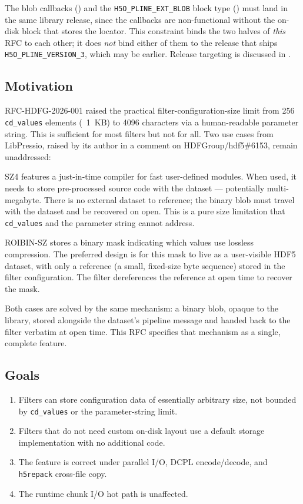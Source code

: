 \documentclass[../RFC-HDFG-2026-003.tex]{subfiles}
\begin{document}
The blob callbacks () and the
\texttt{H5O\_PLINE\_EXT\_BLOB} block type ()
must land in the same library release, since the callbacks are
non-functional without the on-disk block that stores the locator.  This
constraint binds the two halves of \emph{this} RFC to each other; it does
\emph{not} bind either of them to the release that ships
\texttt{H5O\_PLINE\_VERSION\_3}, which may be earlier.  Release targeting
is discussed in .

\subsection{Motivation}
\label{sec:motivation}

RFC-HDFG-2026-001 raised the practical filter-configuration-size limit
from 256 \texttt{cd\_values} elements (~1~KB) to 4096 characters via a
human-readable parameter string. This is sufficient for most filters
but not for all. Two use cases from LibPressio, raised by its author
in a comment on HDFGroup/hdf5\#6153, remain unaddressed:

SZ4 features a just-in-time compiler for fast user-defined modules. When
used, it needs to store pre-processed source code with the dataset ---
potentially multi-megabyte. There is no external dataset to reference;
the binary blob must travel with the dataset and be recovered on open.
This is a pure size limitation that \texttt{cd\_values} and the
parameter string cannot address.

ROIBIN-SZ stores a binary mask indicating which values use lossless
compression. The preferred design is for this mask to live as a
user-visible HDF5 dataset, with only a reference (a small, fixed-size
byte sequence) stored in the filter configuration. The filter
dereferences the reference at open time to recover the mask.

Both cases are solved by the same mechanism: a binary blob, opaque to
the library, stored alongside the dataset's pipeline message and handed
back to the filter verbatim at open time. This RFC specifies that
mechanism as a single, complete feature.

\subsection{Goals}
\label{sec:goals}

\begin{enumerate}
\item Filters can store configuration data of essentially arbitrary size,
  not bounded by \texttt{cd\_values} or the parameter-string limit.
\item Filters that do not need custom on-disk layout use a default
  storage implementation with no additional code.
\item The feature is correct under parallel I/O, DCPL
  encode/decode, and \texttt{h5repack} cross-file copy.
\item The runtime chunk I/O hot path is unaffected.
\end{enumerate}
\end{document}
